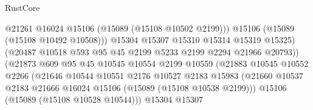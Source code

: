 \begin{lexlean}{RustCore}
\begin{coremodule}
                                            @21261
                                            @16024
                                            @15106
                                            (@15089 (@15108 @10502 @2199)))
                                          @15106
                                          (@15089 (@15108 @10492 @10508)))
                                        @15304
                                        @15307
                                        @15310
                                        @15314
                                        @15319
                                        @15325)
                                      (@20487
                                        @10518
                                        @593
                                        @95
                                        @45
                                        @2199
                                        @5233
                                        @2199
                                        @2294
                                        @21966
                                        @20793))
                                    (@21873
                                      @609
                                      @95
                                      @45
                                      @10545
                                      @10554
                                      @2199
                                      @10559
                                      (@21883
                                        @10545
                                        @10552
                                        @2266
                                        (@21646
                                          @10544
                                          @10551
                                          @2176
                                          @10527
                                          @2183
                                          @15983
                                          (@21660
                                            @10537
                                            @2183
                                            @21666
                                            @16024
                                            @15106
                                            (@15089 (@15108 @10538 @2199)))
                                          @15106
                                          (@15089 (@15108 @10528 @10544)))
                                        @15304
                                        @15307

\end{coremodule}
\end{lexlean}
